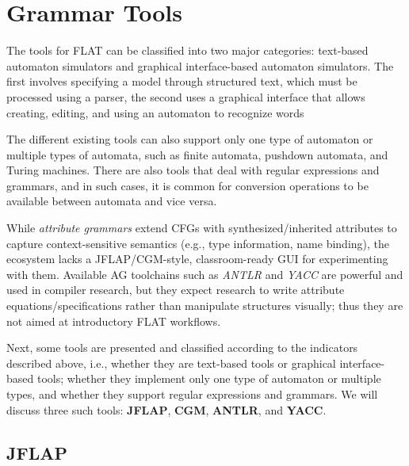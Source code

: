 
%


\chapter{Grammar Tools}
\label{cha:grammar_tools}

The tools for FLAT can be classified into two major categories:
text-based automaton simulators and graphical interface-based automaton simulators. 
The first involves specifying a model through structured text, which must be processed using a parser, the second uses a graphical 
interface that allows creating, editing, and using an automaton to recognize words

The different existing tools can also support only one type of automaton or multiple types of automata, 
such as finite automata, pushdown automata, and Turing machines.
There are also tools that deal with regular expressions and grammars, and in such cases, it is 
common for conversion operations to be available between automata and vice versa.

While \emph{attribute grammars} extend CFGs with synthesized/inherited attributes to capture context-sensitive semantics 
(e.g., type information, name binding), the ecosystem lacks a JFLAP/CGM-style, classroom-ready GUI for experimenting with them. 
Available AG toolchains such as \textit{ANTLR} and \textit{YACC} are powerful and used in compiler research, but they expect 
research to write attribute equations/specifications rather than manipulate structures visually; thus they are not aimed at introductory FLAT workflows. 

Next, some tools are presented and classified according to the indicators described above, i.e., 
whether they are text-based tools or graphical interface-based tools; whether they implement only one type of 
automaton or multiple types, and whether they support regular expressions and grammars.
We will discuss three such tools: \textbf{JFLAP}, \textbf{CGM}, \textbf{ANTLR}, and \textbf{YACC}.

\section{JFLAP} 

